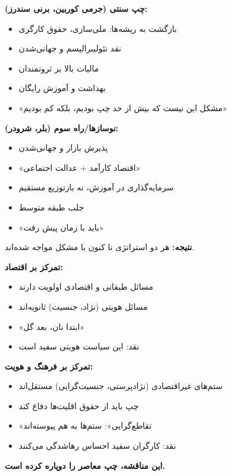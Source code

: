 \begin{debatebox}
\textbf{چپ سنتی (جرمی کوربین، برنی سندرز):}
\begin{itemize}[nosep]
    \item بازگشت به ریشه‌ها: ملی‌سازی، حقوق کارگری
    \item نقد نئولیبرالیسم و جهانی‌شدن
    \item مالیات بالا بر ثروتمندان
    \item بهداشت و آموزش رایگان
    \item «مشکل این نیست که بیش از حد چپ بودیم، بلکه کم بودیم»
\end{itemize}

\textbf{نوسازها/راه سوم (بلر، شرودر):}
\begin{itemize}[nosep]
    \item پذیرش بازار و جهانی‌شدن
    \item «اقتصاد کارآمد + عدالت اجتماعی»
    \item سرمایه‌گذاری در آموزش، نه بازتوزیع مستقیم
    \item جلب طبقه متوسط
    \item «باید با زمان پیش رفت»
\end{itemize}

\textbf{نتیجه:} هر دو استراتژی تا کنون با مشکل مواجه شده‌اند.
\end{debatebox}

\begin{debatebox}
\textbf{تمرکز بر اقتصاد:}
\begin{itemize}[nosep]
    \item مسائل طبقاتی و اقتصادی اولویت دارند
    \item مسائل هویتی (نژاد، جنسیت) ثانویه‌اند
    \item «ابتدا نان، بعد گل»
    \item نقد: این سیاست هویتی سفید است
\end{itemize}

\textbf{تمرکز بر فرهنگ و هویت:}
\begin{itemize}[nosep]
    \item ستم‌های غیراقتصادی (نژادپرستی، جنسیت‌گرایی) مستقل‌اند
    \item چپ باید از حقوق اقلیت‌ها دفاع کند
    \item «تقاطع‌گرایی»: ستم‌ها به هم پیوسته‌اند
    \item نقد: کارگران سفید احساس رهاشدگی می‌کنند
\end{itemize}

\textbf{این مناقشه، چپ معاصر را دوپاره کرده است.}
\end{debatebox}

